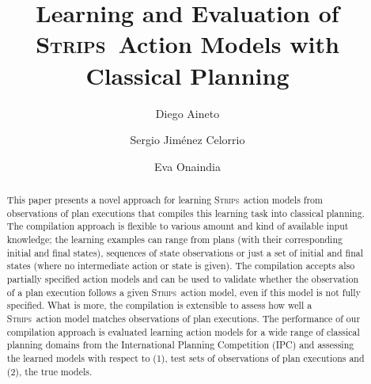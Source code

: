 \documentclass[3p,times]{elsarticle}
\newcommand{\strips}{\textsc{Strips}}     %
\begin{document}
\begin{frontmatter}



\dochead{}

\title{Learning and Evaluation of \strips\ Action Models with Classical Planning}
\author[label1]{Diego Aineto}
\author[label1]{Sergio Jim\'{e}nez Celorrio}
\author[label1]{Eva Onaindia}
\address[label1]{Department of Computer Systems and Computation, Universitat Polit\`ecnica de Val\`encia. Spain}




\begin{abstract}
  This paper presents a novel approach for learning \strips\ action models from observations of plan executions that compiles this learning task into classical planning. The compilation approach is flexible to various amount and kind of available input knowledge; the learning examples can range from plans (with their corresponding initial and final states), sequences of state observations or just a set of initial and final states (where no intermediate action or state is given). The compilation accepts also partially specified action models and can be used to validate whether the observation of a plan execution follows a given \strips\ action model, even if this model is not fully specified. What is more, the compilation is extensible to assess how well a \strips\ action model matches observations of plan executions. The performance of our compilation approach is evaluated learning action models for a wide range of classical planning domains from the International Planning Competition (IPC) and assessing the learned models with respect to (1), test sets of observations of plan executions and (2), the true models.
\end{abstract}


\end{frontmatter}
\end{document}
